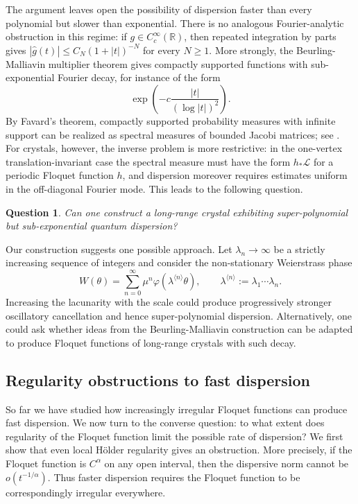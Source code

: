 \documentclass[11pt]{amsart}
\theoremstyle{plain}
\newtheorem{question}[theorem]{Question}
\theoremstyle{definition}
\numberwithin{equation}{section}
\begin{document}
The argument leaves open the possibility of dispersion faster than every polynomial but slower than exponential. There is no analogous Fourier-analytic obstruction in this regime: if $g\in C_c^\infty(\mathbb R)$, then repeated integration by parts gives $|\widehat g(t)|\leq C_N(1+|t|)^{-N}$ for every $N\geq1$. More strongly, the Beurling-Malliavin multiplier theorem \cite{BM} gives compactly supported functions with sub-exponential Fourier decay, for instance of the form
$$
\exp\left(-c\frac{|t|}{(\log |t|)^2}\right).
$$
By Favard's theorem, compactly supported probability measures with infinite support can be realized as spectral measures of bounded Jacobi matrices; see \cite{KillipSimon}. For crystals, however, the inverse problem is more restrictive: in the one-vertex translation-invariant case the spectral measure must have the form $h_*\mathcal L$ for a periodic Floquet function $h$, and dispersion moreover requires estimates uniform in the off-diagonal Fourier mode. This leads to the following question.

\begin{question}
Can one construct a long-range crystal exhibiting super-polynomial but sub-exponential quantum dispersion?
\end{question}

Our construction suggests one possible approach. Let $\lambda_n\to\infty$ be a strictly increasing sequence of integers and consider the non-stationary Weierstrass phase
$$
W(\theta)=\sum_{n=0}^\infty \mu^n\varphi(\lambda^{\langle n\rangle}\theta),
\qquad
\lambda^{\langle n\rangle}:=\lambda_1\cdots\lambda_n.
$$
Increasing the lacunarity with the scale could produce progressively stronger oscillatory cancellation and hence super-polynomial dispersion. Alternatively, one could ask whether ideas from the Beurling-Malliavin construction can be adapted to produce Floquet functions of long-range crystals with such decay.

\subsection{Regularity obstructions to fast dispersion}

So far we have studied how increasingly irregular Floquet functions can produce fast dispersion. We now turn to the converse question: to what extent does regularity of the Floquet function limit the possible rate of dispersion? We first show that even local H\"older regularity gives an obstruction. More precisely, if the Floquet function is $C^\alpha$ on any open interval, then the dispersive norm cannot be $o(t^{-1/\alpha})$. Thus faster dispersion requires the Floquet function to be correspondingly irregular everywhere.
\end{document}
